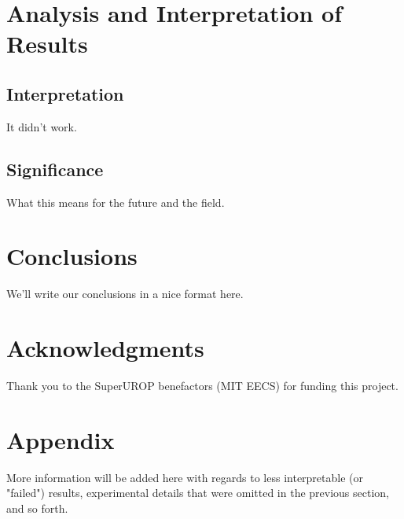 \documentclass{article} %
\begin{document}
\section{Analysis and Interpretation of Results}
\subsection{Interpretation}
It didn't work.

\subsection{Significance}
What this means for the future and the field.

\section{Conclusions}
We'll write our conclusions in a nice format here.

\section*{Acknowledgments}
Thank you to the SuperUROP benefactors (MIT EECS) for funding this project.




\appendix
\section{Appendix}
More information will be added here with regards to less interpretable (or "failed")
results, experimental details that were omitted in the previous section, and so forth.
\end{document}
